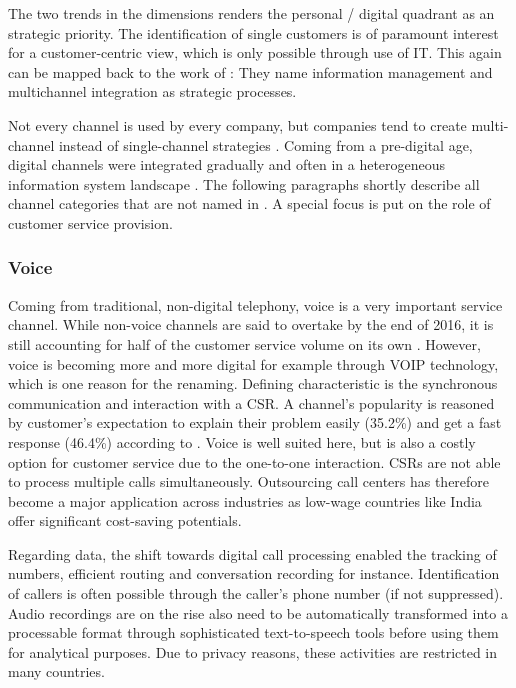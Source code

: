 		The two trends in the dimensions renders the personal / digital quadrant as an strategic priority.
		The identification of single customers is of paramount interest for a customer-centric view, which is only possible through use of \acrshort{IT}.  
		This again can be mapped back to the work of \citeauthor{paynefrow2005}: They name information management and multichannel integration as strategic processes. 
		
		Not every channel is used by every company, but companies tend to create multi-channel instead of single-channel strategies \citep{Frow_2007}. Coming from a pre-digital age, digital channels were integrated gradually and often in a heterogeneous information system landscape \citep{Chen_2003}. The following paragraphs shortly describe all channel categories that are not named  in  \cite{paynefrow2005}. A special focus is put on the role of customer service provision. 
		
		
		\subsubsection{Voice}
		
		Coming from traditional, non-digital telephony, voice is a very important service channel. While non-voice channels are said to overtake by the end of 2016, it is still accounting for half of the customer service volume on its own \citep{dimensiondata2016}. However, voice is becoming more and more digital for example through \acrfull{VOIP} technology, which is one reason for the renaming. Defining characteristic is the synchronous communication and interaction with a \acrfull{CSR}. A channel's popularity is reasoned by customer's expectation to explain their problem easily (35.2\%) and get a fast response (46.4\%) according to \citep{Agnischock2015}. Voice is well suited here, but is also a costly option for customer service due to the one-to-one interaction. \acrshort{CSR}s are not able to process multiple calls simultaneously. Outsourcing call centers has therefore become a major application across industries as low-wage countries like India offer significant cost-saving potentials. 
		
		Regarding data, the shift towards digital call processing enabled the tracking of numbers, efficient routing and conversation recording for instance. Identification of callers is often possible through the caller's phone number (if not suppressed). %
		Audio recordings are on the rise \citep{ccnet2016} also need to be automatically transformed into a processable format through sophisticated text-to-speech tools before using them for analytical purposes. Due to privacy reasons, these activities are restricted in many countries. 
		
